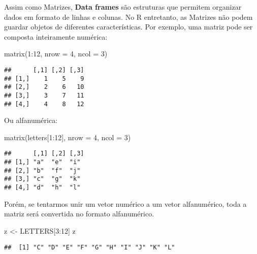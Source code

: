 \documentclass[
]{book}
\newenvironment{Shaded}{\begin{snugshade}}{\end{snugshade}}
\newcommand{\AttributeTok}[1]{\textcolor[rgb]{0.77,0.63,0.00}{#1}}
\newcommand{\DecValTok}[1]{\textcolor[rgb]{0.00,0.00,0.81}{#1}}
\newcommand{\FunctionTok}[1]{\textcolor[rgb]{0.00,0.00,0.00}{#1}}
\newcommand{\NormalTok}[1]{#1}
\newcommand{\OtherTok}[1]{\textcolor[rgb]{0.56,0.35,0.01}{#1}}
\newcommand{\SpecialCharTok}[1]{\textcolor[rgb]{0.00,0.00,0.00}{#1}}
\begin{document}
Assim como Matrizes, \textbf{Data frames} são estruturas que permitem organizar dados em formato de linhas e colunas. No R entretanto, as Matrizes não podem guardar objetos de diferentes características. Por exemplo, uma matriz pode ser composta inteiramente numérica:

\begin{Shaded}
\begin{Highlighting}[]
\FunctionTok{matrix}\NormalTok{(}\DecValTok{1}\SpecialCharTok{:}\DecValTok{12}\NormalTok{, }\AttributeTok{nrow =} \DecValTok{4}\NormalTok{, }\AttributeTok{ncol =} \DecValTok{3}\NormalTok{)}
\end{Highlighting}
\end{Shaded}

\begin{verbatim}
##      [,1] [,2] [,3]
## [1,]    1    5    9
## [2,]    2    6   10
## [3,]    3    7   11
## [4,]    4    8   12
\end{verbatim}

Ou alfanumérica:

\begin{Shaded}
\begin{Highlighting}[]
\FunctionTok{matrix}\NormalTok{(letters[}\DecValTok{1}\SpecialCharTok{:}\DecValTok{12}\NormalTok{], }\AttributeTok{nrow =} \DecValTok{4}\NormalTok{, }\AttributeTok{ncol =} \DecValTok{3}\NormalTok{)}
\end{Highlighting}
\end{Shaded}

\begin{verbatim}
##      [,1] [,2] [,3]
## [1,] "a"  "e"  "i" 
## [2,] "b"  "f"  "j" 
## [3,] "c"  "g"  "k" 
## [4,] "d"  "h"  "l"
\end{verbatim}

Porém, se tentarmos unir um vetor numérico a um vetor alfanumérico, toda a matriz será convertida no formato alfanumérico.

\begin{Shaded}
\begin{Highlighting}[]
\NormalTok{z }\OtherTok{\textless{}{-}}\NormalTok{ LETTERS[}\DecValTok{3}\SpecialCharTok{:}\DecValTok{12}\NormalTok{]}
\NormalTok{z}
\end{Highlighting}
\end{Shaded}

\begin{verbatim}
##  [1] "C" "D" "E" "F" "G" "H" "I" "J" "K" "L"
\end{verbatim}
\end{document}
